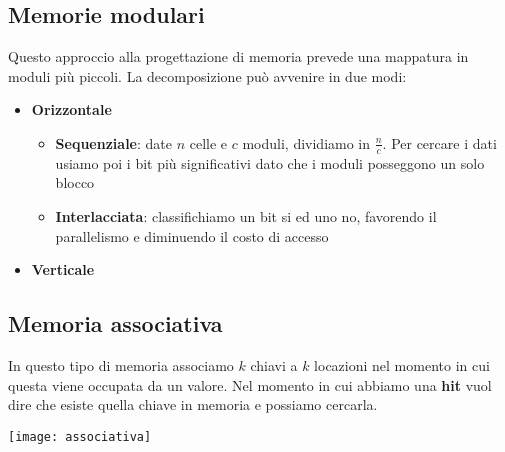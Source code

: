 \subsection{Memorie modulari}
Questo approccio alla progettazione di memoria prevede una mappatura in moduli più piccoli. La decomposizione può avvenire in due modi:
\begin{itemize}
	\item \textbf{Orizzontale}
	\begin{itemize}
		\item \textbf{Sequenziale}: date $n$ celle e $c$ moduli, dividiamo in $\frac{n}{c}$. Per cercare i dati usiamo poi i bit più significativi dato che i moduli posseggono un solo blocco
		\item \textbf{Interlacciata}: classifichiamo un bit si ed uno no, favorendo il parallelismo e diminuendo il costo di accesso
	\end{itemize}
	\item \textbf{Verticale}
\end{itemize}

\subsection{Memoria associativa}
In questo tipo di memoria associamo $k$ chiavi a $k$ locazioni nel momento in cui questa viene occupata da un valore. Nel momento in cui abbiamo una \textbf{hit} vuol dire che esiste quella chiave in memoria e possiamo cercarla.
\begin{center}
	\texttt{[image: associativa]}
\end{center}